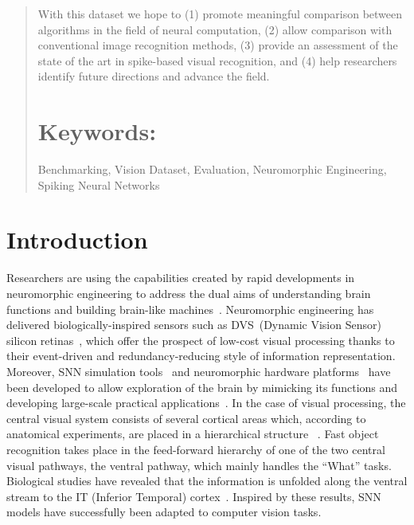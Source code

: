 \documentclass{frontiersENG} %
\begin{document}
\begin{abstract}
With this dataset we hope to (1) promote meaningful comparison between algorithms in the field of neural computation, (2) allow comparison with conventional image recognition methods, (3) provide an assessment of the state of the art in spike-based visual recognition, and (4) help researchers identify future directions and advance the field.

\tiny
\section{Keywords:} Benchmarking, Vision Dataset, Evaluation, Neuromorphic Engineering, Spiking Neural Networks
\end{abstract}

\section{Introduction}
\label{sec:intro}
Researchers are using the capabilities created by rapid developments in neuromorphic engineering to address the dual aims of understanding brain functions and building brain-like machines~\citep{furber2007neural}.
Neuromorphic engineering has delivered biologically-inspired sensors such as DVS~(Dynamic Vision Sensor) silicon retinas~\citep{serrano2013128, delbruck2008frame, yang2015dynamic, posch2014retinomorphic}, which offer the prospect of low-cost visual processing thanks to their event-driven and redundancy-reducing style of information representation.
Moreover, SNN simulation tools~\citep{davison2008pynn, gewaltig2007nest, goodman2008brian} and neuromorphic hardware platforms~\citep{furber2014spinnaker,  schemmel2010wafer,benjamin2014neurogrid,merolla2014million} have been developed to allow exploration of the brain by mimicking its functions and developing large-scale practical applications~\citep{eliasmith2012large}.
In the case of visual processing, the central visual system consists of several cortical areas which, according to anatomical experiments, are placed in a hierarchical structure ~\citep{felleman1991distributed}.
Fast object recognition takes place in the feed-forward hierarchy of one of the two central visual pathways, the ventral pathway, which mainly handles the ``What'' tasks.
Biological studies have revealed that the information is unfolded along the ventral stream to the IT (Inferior Temporal) cortex~\citep{dicarlo2012does}.
Inspired by these results, SNN models have successfully been adapted to computer vision tasks.  
\end{document}
